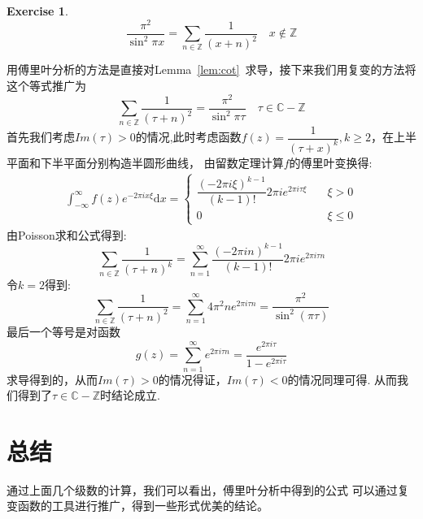 \documentclass[a4paper,12pt]{ctexart}
\newenvironment{prooff}{{\noindent\it\textcolor{cyan!40!black}{Proof}:}\quad}{\par}
\newtheorem{exer}[defn]{Exercise}
\newcommand{\bb}[1]{\mathbb{#1}}
\begin{document}
\begin{exer}
    \begin{equation*}
        \frac{\pi^2}{\sin^{2}\pi x}=\sum_{n\in \bb{Z}}\frac{1}{(x+n)^2}\quad x\notin  \bb{Z}
    \end{equation*}
\end{exer}
\begin{prooff}
    用傅里叶分析的方法是直接对Lemma~\ref{lem:cot}~求导，接下来我们用复变的方法将这个等式推广为
    \begin{equation*}
        \sum_{n\in \bb{Z}}\frac{1}{(\tau +n)^2}= \frac{\pi^2}{\sin^{2}\pi \tau}\quad \tau\in \bb{C}-\bb{Z}
    \end{equation*}
    首先我们考虑$Im(\tau)>0 $的情况,此时考虑函数$f(z)=\dfrac{1}{(\tau+x)^k},k\ge 2$，在上半平面和下半平面分别构造半圆形曲线，
    由留数定理计算$f$的傅里叶变换得:
    \begin{align*}
        \int_{-\infty}^{\infty}f(z)e^{-2\pi ix\xi }\text{d}x=
        \begin{cases}
            \dfrac{(-2\pi i\xi)^{k-1}}{(k-1)!}2\pi ie^{2\pi i\tau \xi} & \quad \xi >0     \\
            0                                                          & \quad  \xi \le 0
        \end{cases}
    \end{align*}
    由Poisson求和公式得到:
    \begin{equation*}
        \sum_{n\in \bb{Z}}\frac{1}{(\tau+n)^k}=\sum_{n=1}^{\infty}\dfrac{(-2\pi i n)^{k-1}}{(k-1)!}2\pi ie^{2\pi i\tau n}
    \end{equation*}
    令$k=2$得到:
    \begin{equation*}
        \sum_{n\in \bb{Z} }\frac{1}{(\tau+n)^2}=\sum_{n=1}^{\infty}4\pi^2ne^{2\pi i\tau n}=\frac{\pi^2}{\sin^2 (\pi \tau )}
    \end{equation*}
    最后一个等号是对函数
    \begin{equation*}
        g(z)=\sum_{n=1}^{\infty}e^{2\pi i \tau n }=\frac{e^{2\pi i\tau} }{1-e^{2\pi i \tau}}
    \end{equation*}
    求导得到的，从而$Im(\tau)>0$的情况得证，$Im(\tau)<0$的情况同理可得.
    从而我们得到了$\tau \in \bb{C}-\bb{Z}$时结论成立.
\end{prooff}
\section{总结}
通过上面几个级数的计算，我们可以看出，傅里叶分析中得到的公式
可以通过复变函数的工具进行推广，得到一些形式优美的结论。
\end{document}
